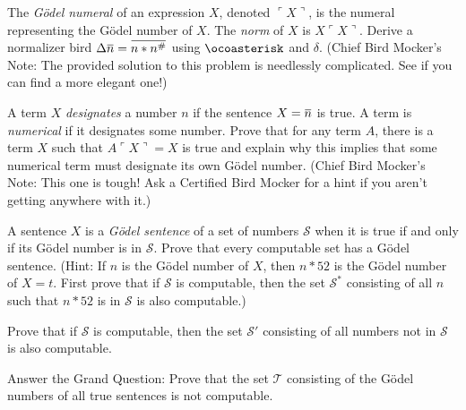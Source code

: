 \documentclass[12pt, letterpaper]{article}
\begin{document}
\begin{prob}{25.2}
The \emph{G\"odel numeral} of an expression $X$, denoted $\ulcorner X \urcorner$, is the numeral representing the G\"odel number of $X$. The \emph{norm} of $X$ is $X\ulcorner X \urcorner$. Derive a normalizer bird $\Delta \noverline{n} = \noverline{n \ast n^\#}$ using $\ocoasterisk$ and $\delta$. (Chief Bird Mocker's Note: The provided solution to this problem is needlessly complicated. See if you can find a more elegant one!)
\end{prob}

\begin{prob}{25.3}
A term $X$ \emph{designates} a number $n$ if the sentence $X = \noverline{n}$ is true. A term is \emph{numerical} if it designates some number. Prove that for any term $A$, there is a term $X$ such that $A\ulcorner X \urcorner = X$ is true and explain why this implies that some numerical term must designate its own G\"odel number. (Chief Bird Mocker's Note: This one is tough! Ask a Certified Bird Mocker for a hint if you aren't getting anywhere with it.)
\end{prob}

\begin{prob}{25.4}
A sentence $X$ is a \emph{G\"odel sentence} of a set of numbers $\mathscr{S}$ when it is true if and only if its G\"odel number is in $\mathscr{S}$. Prove that every computable set has a G\"odel sentence. (Hint: If $n$ is the G\"odel number of $X$, then $n \ast 52$ is the G\"odel number of $X = t$. First prove that if $\mathscr{S}$ is computable, then the set $\mathscr{S}^*$ consisting of all $n$ such that $n \ast 52$ is in $\mathcal{S}$ is also computable.)
\end{prob}

\begin{prob}{25.5}
Prove that if $\mathscr{S}$ is computable, then the set $\mathscr{S}'$ consisting of all numbers not in $\mathscr{S}$ is also computable.
\end{prob}

\begin{prob}{25.5}
Answer the Grand Question: Prove that the set $\mathscr{T}$ consisting of the  G\"odel numbers of all true sentences is not computable.
\end{prob}
\end{document}
